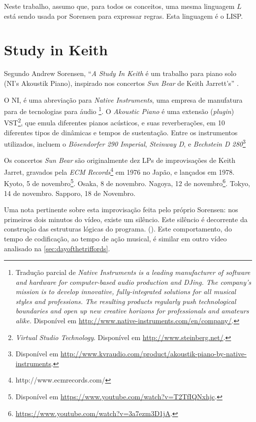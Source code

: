 \documentclass[
	12pt,				%
	openright,			%
	twoside,			%
	a4paper,			%
	english,			%
	french,				%
	spanish,			%
        italian,                        %
	brazil				%
	]{abntex2}
\begin{document}
Neste trabalho, assumo que, para todos os conceitos, uma mesma linguagem $L$ está sendo usada por Sorensen para expressar regras. Esta linguagem é o LISP.

\section{Study in Keith}\label{sec:studyinkeith}

Segundo Andrew Sorensen, ``\emph{A Study In Keith} é um trabalho para piano solo (NI's Akoustik Piano), inspirado nos concertos \emph{Sun Bear} de Keith Jarrett's'' \cite{sorensen_keith_2009}.

O NI, é uma abreviação para \emph{Native Instruments}, uma empresa de manufatura para  de tecnologias para áudio \footnote{Tradução parcial  de \emph{Native Instruments is a leading manufacturer of software and hardware for computer-based audio production and DJing. The company's mission is to develop innovative, fully-integrated solutions for all musical styles and professions. The resulting products regularly push technological boundaries and open up new creative horizons for professionals and amateurs alike.} Disponível em \url{http://www.native-instruments.com/en/company/}.}. O \emph{Akoustic Piano} é uma extensão (\emph{plugin}) VST\footnote{\emph{Virtual Studio Technology}. Disponível em \url{http://www.steinberg.net/}.}, que emula diferentes pianos acústicos, e suas reverberações, em 10 diferentes tipos de dinâmicas e tempos de sustentação. Entre os instrumentos utilizados, incluem o \emph{Bösendorfer 290 Imperial}, \emph{Steinway D}, e \emph{Bechstein D 280}\footnote{Disponível em \url{http://www.kvraudio.com/product/akoustik-piano-by-native-instruments}.}

Os concertos \emph{Sun Bear} são originalmente dez LPs  de improvisações de Keith Jarret, gravados pela \emph{ECM Records}\footnote{http://www.ecmrecords.com/} em 1976 no Japão, e lançados em 1978. Kyoto, 5 de novembro\footnote{Disponível em \url{https://www.youtube.com/watch?v=T2TfIQNxhjc}.}. Osaka, 8 de novembro. Nagoya, 12 de novembro\footnote{\url{https://www.youtube.com/watch?v=3a7ezm3D1jA}.}. Tokyo, 14 de novembro. Sapporo, 18 de Novembro.

Uma nota pertinente sobre esta improvisação feita pelo próprio Sorensen: nos primeiros dois minutos do vídeo, existe um silêncio. Este silêncio é decorrente da construção das estruturas lógicas do programa. (). Este comportamento, do tempo de codificação, ao tempo de ação musical, é similar em outro vídeo analisado na  \autoref{sec:dayofthetriffords}. 
\end{document}
